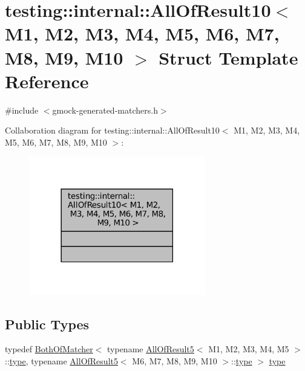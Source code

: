 \hypertarget{structtesting_1_1internal_1_1AllOfResult10}{}\section{testing\+:\+:internal\+:\+:All\+Of\+Result10$<$ M1, M2, M3, M4, M5, M6, M7, M8, M9, M10 $>$ Struct Template Reference}
\label{structtesting_1_1internal_1_1AllOfResult10}


{\ttfamily \#include $<$gmock-\/generated-\/matchers.\+h$>$}



Collaboration diagram for testing\+:\+:internal\+:\+:All\+Of\+Result10$<$ M1, M2, M3, M4, M5, M6, M7, M8, M9, M10 $>$\+:
\nopagebreak
\begin{figure}[H]
\begin{center}
\leavevmode
\includegraphics[width=218pt]{structtesting_1_1internal_1_1AllOfResult10__coll__graph}
\end{center}
\end{figure}
\subsection*{Public Types}
\begin{DoxyCompactItemize}
\item 
typedef \hyperlink{classtesting_1_1internal_1_1BothOfMatcher}{Both\+Of\+Matcher}$<$ typename \hyperlink{structtesting_1_1internal_1_1AllOfResult5}{All\+Of\+Result5}$<$ M1, M2, M3, M4, M5 $>$\+::\hyperlink{structtesting_1_1internal_1_1AllOfResult10_a48d6c6de6d0d5445b212119e1f536af5}{type}, typename \hyperlink{structtesting_1_1internal_1_1AllOfResult5}{All\+Of\+Result5}$<$ M6, M7, M8, M9, M10 $>$\+::\hyperlink{structtesting_1_1internal_1_1AllOfResult10_a48d6c6de6d0d5445b212119e1f536af5}{type} $>$ \hyperlink{structtesting_1_1internal_1_1AllOfResult10_a48d6c6de6d0d5445b212119e1f536af5}{type}
\end{DoxyCompactItemize}



